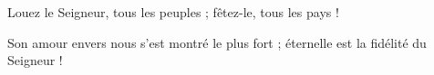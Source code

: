 \item Louez le Seigneur, tous les peuples ; fêtez-le, tous les pays !

\item Son amour envers nous s'est montré le plus fort ; éternelle est la fidélité du Seigneur !